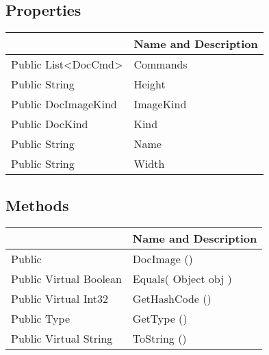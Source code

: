 \documentclass[11pt, oneside, a4paper]{book}
\begin{document}
\subsection{Properties}
\begin{center}
\begin{tabular}{| p{3cm} | p{12cm} | }
\hline
\textbf{ } & \textbf{ Name and Description}\\
\hline
 Public  List<DocCmd> &  Commands\hypertarget{SoftwareEngineeringTools.{}Documentation.{}DocImage.{}Commands}{}\\
\hline
 Public  String &  Height\hypertarget{SoftwareEngineeringTools.{}Documentation.{}DocImage.{}Height}{}\\
\hline
 Public  DocImageKind &  ImageKind\hypertarget{SoftwareEngineeringTools.{}Documentation.{}DocImage.{}ImageKind}{}\\
\hline
 Public  DocKind &  Kind\hypertarget{SoftwareEngineeringTools.{}Documentation.{}DocImage.{}Kind}{}\\
\hline
 Public  String &  Name\hypertarget{SoftwareEngineeringTools.{}Documentation.{}DocImage.{}Name}{}\\
\hline
 Public  String &  Width\hypertarget{SoftwareEngineeringTools.{}Documentation.{}DocImage.{}Width}{}\\
\hline
\end{tabular}
\end{center}

\subsection{Methods}
\begin{center}
\begin{tabular}{| p{3cm} | p{12cm} | }
\hline
\textbf{ } & \textbf{ Name and Description}\\
\hline
 Public  &  DocImage ()\hypertarget{SoftwareEngineeringTools.{}Documentation.{}DocImage.{}DocImage}{}\\
\hline
 Public  Virtual  Boolean &  Equals(\hypertarget{SoftwareEngineeringTools.{}Documentation.{}DocImage.{}Equals\_Object}{} Object  obj  )\\
\hline
 Public  Virtual  Int32 &  GetHashCode ()\hypertarget{SoftwareEngineeringTools.{}Documentation.{}DocImage.{}GetHashCode}{}\\
\hline
 Public  Type &  GetType ()\hypertarget{SoftwareEngineeringTools.{}Documentation.{}DocImage.{}GetType}{}\\
\hline
 Public  Virtual  String &  ToString ()\hypertarget{SoftwareEngineeringTools.{}Documentation.{}DocImage.{}ToString}{}\\
\hline
\end{tabular}
\end{center}
 
\end{document}
